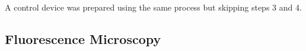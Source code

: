 \documentclass[
  a4paper,
]{scrbook}
\begin{document}
A control device was prepared using the same process but skipping steps
3 and 4.

\hypertarget{sec-PBASE-GFP-OR-microscopy}{%
\subsection{Fluorescence Microscopy}\label{sec-PBASE-GFP-OR-microscopy}}

\begin{figure}

\begin{minipage}[t]{0.47\linewidth}

{\centering 


}

\subcaption{\label{fig-GFP-OR-ch6-zoom}}
\end{minipage}%
%
\begin{minipage}[t]{0.05\linewidth}

{\centering 

~

}

\end{minipage}%
%
\begin{minipage}[t]{0.47\linewidth}

{\centering 

\raisebox{-\height}{

}}
\end{minipage}
\end{figure}
\end{document}
